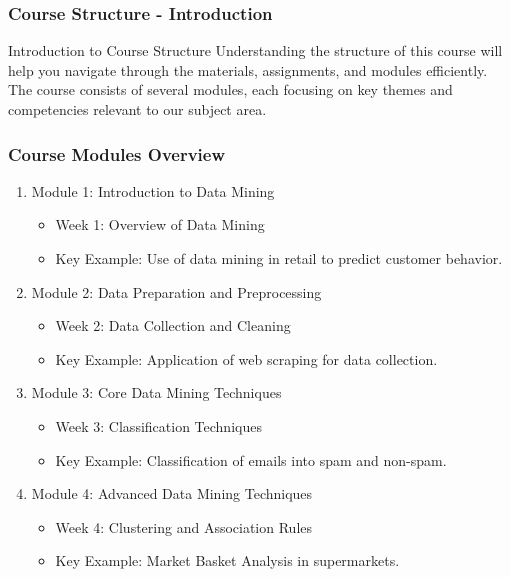 \documentclass[aspectratio=169]{beamer}
\begin{document}
\begin{frame}[fragile]
    \frametitle{Course Structure - Introduction}
    \begin{block}{Introduction to Course Structure}
        Understanding the structure of this course will help you navigate through the materials, assignments, and modules efficiently. The course consists of several modules, each focusing on key themes and competencies relevant to our subject area.
    \end{block}
\end{frame}

\begin{frame}[fragile]
    \frametitle{Course Modules Overview}
    \begin{enumerate}
        \item Module 1: Introduction to Data Mining
        \begin{itemize}
            \item Week 1: Overview of Data Mining
            \item Key Example: Use of data mining in retail to predict customer behavior.
        \end{itemize}
        
        \item Module 2: Data Preparation and Preprocessing
        \begin{itemize}
            \item Week 2: Data Collection and Cleaning
            \item Key Example: Application of web scraping for data collection.
        \end{itemize}
        
        \item Module 3: Core Data Mining Techniques
        \begin{itemize}
            \item Week 3: Classification Techniques
            \item Key Example: Classification of emails into spam and non-spam.
        \end{itemize}
        
        \item Module 4: Advanced Data Mining Techniques
        \begin{itemize}
            \item Week 4: Clustering and Association Rules
            \item Key Example: Market Basket Analysis in supermarkets.
        \end{itemize}
        

\end{enumerate}
\end{frame}
\end{document}
